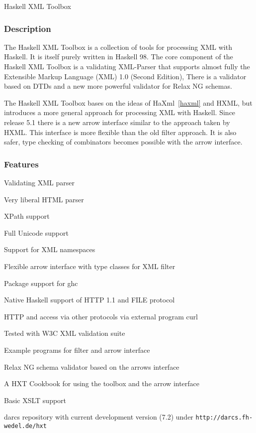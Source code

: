 \begin{hcarentry}[updated]{Haskell XML Toolbox}
\label{hxt}
\makeheader

\subsubsection*{Description}

The Haskell XML Toolbox is a collection of tools for processing XML with
Haskell. It is itself purely written in Haskell 98. The core component of the
Haskell XML Toolbox is a validating XML-Parser that supports
almost fully the Extensible Markup Language (XML) 1.0 (Second Edition),
There is a validator based on DTDs and a new more powerful validator for
Relax NG schemas.

The Haskell XML Toolbox bases on the ideas of HaXml~\cref{haxml} and HXML,
but introduces a more general approach for processing XML with Haskell.
Since release 5.1 there is a new arrow interface similar to the approach
taken by HXML. This interface is more flexible than the old filter approach.
It is also safer, type checking of combinators becomes possible with the arrow
interface.

\subsubsection*{Features}

\begin{compactitem}
\item Validating XML parser
\item Very liberal HTML parser
\item XPath support
\item Full Unicode support
\item Support for XML namespaces
\item Flexible arrow interface with type classes for XML filter
\item Package support for ghc
\item Native Haskell support of HTTP 1.1 and FILE protocol
\item HTTP and access via other protocols via external program curl
\item Tested with W3C XML validation suite
\item Example programs for filter and arrow interface
\item Relax NG schema validator based on the arrows interface
\item A HXT Cookbook for using the toolbox and the arrow interface
\item Basic XSLT support
\item darcs repository with current development version (7.2) under {\tt http://darcs.fh-wedel.de/hxt}
\end{compactitem}


\end{hcarentry}
